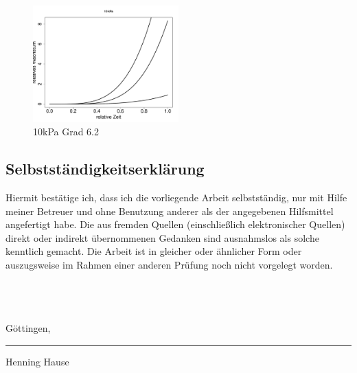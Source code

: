 \documentclass[12pt,a4paper]{article}
\theoremstyle{definition}
\theoremstyle{definition}
\theoremstyle{definition}
\theoremstyle{definition}
\begin{document}
\begin{figure}[H] 
  \centering
     \includegraphics[width=0.5\textwidth]{10kPa-Grad-6-2-KB}
  \caption{10kPa Grad 6.2}
  \label{10kPa Grad 6.2}
\end{figure}



\nocite{Hsu41}

\newpage
\printbibliography


\newpage
\subsection*{Selbstständigkeitserklärung}
Hiermit bestätige ich, dass ich die vorliegende Arbeit selbstständig, nur mit Hilfe meiner Betreuer und ohne Benutzung anderer als der angegebenen Hilfsmittel angefertigt habe. Die aus fremden Quellen (einschließlich elektronischer Quellen) direkt oder indirekt übernommenen Gedanken sind ausnahmslos als solche kenntlich gemacht. Die Arbeit ist in gleicher oder ähnlicher Form oder auszugsweise im Rahmen einer anderen Prüfung noch nicht vorgelegt worden.
\\ \\ \\ \\
\parbox{5cm}{\centering Göttingen, }
\hfill\parbox{4cm}{\hrule \strut \centering  \footnotesize Henning Hause}
\end{document}
